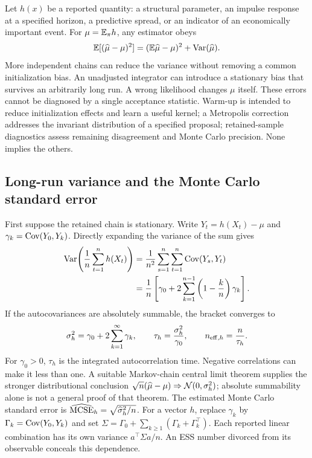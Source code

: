 Let $h(x)$ be a reported quantity: a structural parameter, an impulse
response at a specified horizon, a predictive spread, or an indicator of an
economically important event. For $\mu=\mathbb{E}_\pi h$, any estimator obeys
\begin{equation}
 \mathbb{E}[(\widehat\mu-\mu)^2]
   =(\mathbb{E}\widehat\mu-\mu)^2+\operatorname{Var}(\widehat\mu).
 \label{eq:bf-modern-mse}
\end{equation}
More independent chains can reduce the variance without removing a common
initialization bias. An unadjusted integrator can introduce a stationary bias
that survives an arbitrarily long run. A wrong likelihood changes $\mu$
itself. These errors cannot be diagnosed by a single acceptance statistic.
Warm-up is intended to reduce initialization effects and learn a useful
kernel; a Metropolis correction addresses the invariant distribution of a
specified proposal; retained-sample diagnostics assess remaining disagreement
and Monte Carlo precision. None implies the others.

\subsection{Long-run variance and the Monte Carlo standard error}

First suppose the retained chain is stationary. Write
$Y_t=h(X_t)-\mu$ and $\gamma_k=\operatorname{Cov}(Y_0,Y_k)$. Directly expanding the
variance of the sum gives
\begin{align}
 \operatorname{Var}\!\left(\frac1n\sum_{t=1}^n h(X_t)\right)
 &=\frac1{n^2}\sum_{s=1}^n\sum_{t=1}^n\operatorname{Cov}(Y_s,Y_t)\\
 &=\frac1n\left[\gamma_0+
        2\sum_{k=1}^{n-1}\left(1-\frac{k}{n}\right)\gamma_k\right].
 \label{eq:bf-modern-finite-mc-variance}
\end{align}
If the autocovariances are absolutely summable, the bracket converges to
\begin{equation}
 \sigma_h^2=\gamma_0+2\sum_{k=1}^\infty\gamma_k,\qquad
 \tau_h=\frac{\sigma_h^2}{\gamma_0},\qquad
 n_{{\rm eff},h}=\frac{n}{\tau_h}.
 \label{eq:bf-modern-longrun-variance}
\end{equation}
For $\gamma_0>0$, $\tau_h$ is the integrated autocorrelation time.
Negative correlations can make it less than one. A suitable Markov-chain
central limit theorem supplies the stronger distributional conclusion
$\sqrt n(\widehat\mu-\mu)\Rightarrow\mathcal{N}(0,\sigma_h^2)$;
absolute summability alone is not a general proof of that theorem.
The estimated Monte Carlo standard error is
$\widehat{\rm MCSE}_h=\sqrt{\widehat\sigma_h^2/n}$.
For a vector $h$, replace $\gamma_k$ by $\Gamma_k=\operatorname{Cov}(Y_0,Y_k)$ and set
$\Sigma=\Gamma_0+\sum_{k\geq1}(\Gamma_k+\Gamma_k^\top)$.
Each reported linear combination has its own variance $a^\top\Sigma a/n$.
An ESS number divorced from its observable conceals this dependence.

